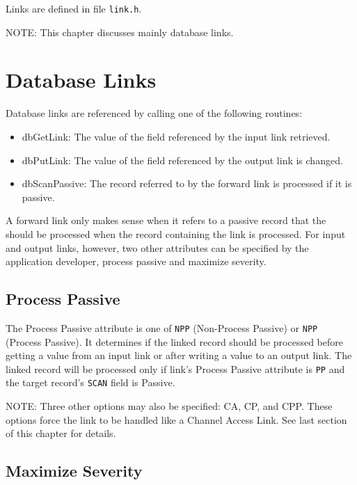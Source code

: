 Links are defined in file \verb|link.h|.

NOTE: This chapter discusses mainly database links.

\section{Database Links}

Database links are referenced by calling one of the following routines:

\begin{itemize}
\item {}dbGetLink: The value of the field referenced by the input link retrieved.

\item {}dbPutLink: The value of the field referenced by the output link is changed.

\item {}dbScanPassive: The record referred to by the forward link is processed if it is passive.

\end{itemize}

A forward link only makes sense when it refers to a passive record that the should be processed when the record 
containing the link is processed. For input and output links, however, two other attributes can be specified by the 
application developer, process passive and maximize severity.

\subsection{Process Passive}

The Process Passive attribute is one of \verb|NPP| (Non-Process Passive) or \verb|NPP| (Process Passive).
It determines if the linked record should be processed before getting a value from an input link or after writing a value to an output link.
The linked record will be processed only if link's Process Passive attribute is \verb|PP| and the target record's \verb|SCAN| field is Passive.

NOTE: Three other options may also be specified: CA, CP, and CPP. These options force the link to be handled like a 
Channel Access Link. See last section of this chapter for details.

\subsection{Maximize Severity}

